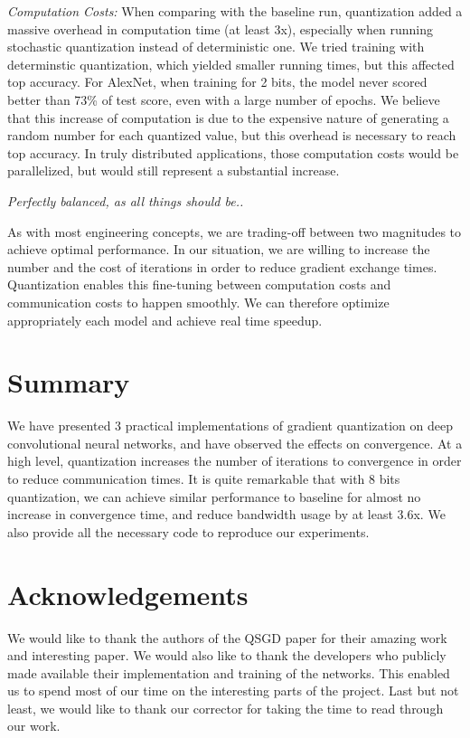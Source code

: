 \documentclass[10pt,conference,compsocconf]{IEEEtran}
\begin{document}
\textit{Computation Costs:} When comparing with the baseline run, quantization added a massive overhead in computation time (at least 3x), especially when running stochastic quantization instead of deterministic one. We tried training with determinstic quantization, which yielded smaller running times, but this affected top accuracy. For AlexNet, when training for 2 bits, the model never scored better than 73\% of test score, even with a large number of epochs. We believe that this increase of computation is due to the expensive nature of generating a random number for each quantized value, but this overhead is necessary to reach top accuracy. In truly distributed applications, those computation costs would be parallelized, but would still represent a substantial increase.


\begin{center}
\textit{Perfectly balanced, as all things should be..}
\end{center}

As with most engineering concepts, we are trading-off between two magnitudes to achieve optimal performance. In our situation, we are willing to increase the number and the cost of iterations in order to reduce gradient exchange times. Quantization enables this fine-tuning between computation costs and communication costs to happen smoothly. We can therefore optimize appropriately each model and achieve real time speedup.


\section{Summary}

We have presented 3 practical implementations of gradient quantization on deep convolutional neural networks, and have observed the effects on convergence. At a high level, quantization increases the number of iterations to convergence in order to reduce communication times. It is quite remarkable that with 8 bits quantization, we can achieve similar performance to baseline for almost no increase in convergence time, and reduce bandwidth usage by at least 3.6x. We also provide all the necessary code to reproduce our experiments.

\section*{Acknowledgements}

We would like to thank the authors of the QSGD paper for their amazing work and interesting paper. We would also like to thank the developers who publicly made available their implementation and training of the networks. This enabled us to spend most of our time on the interesting parts of the project. Last but not least, we would like to thank our corrector for taking the time to read through our work.

\singlespacing
\singlespacing


\end{document}
